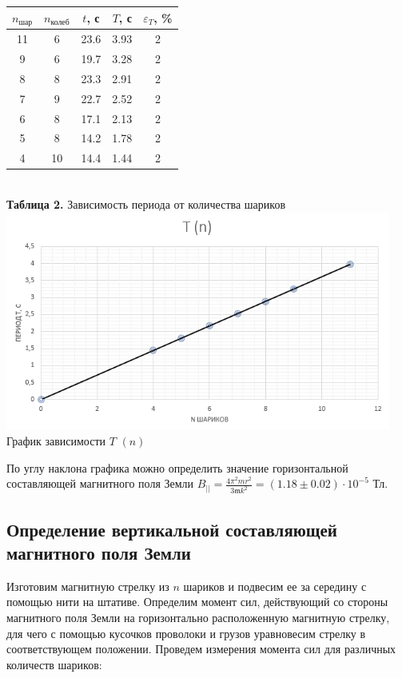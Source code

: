 \documentclass[a4paper,12pt]{article} %
\begin{document}
\begin{center}
    \begin{tabular}{|c|c|c|c|c|}\hline
    $n_{\text{шар}}$ & $n_{\text{колеб}}$ & $t$, с & $T$, с & $\varepsilon_T$, \%\\ \hline
        11 & 6 &  23.6 & 3.93 & 2 \\ \hline
        9  & 6 &  19.7 & 3.28 & 2 \\ \hline
        8  & 8 &  23.3 & 2.91 & 2 \\ \hline
        7  & 9 &  22.7 & 2.52 & 2 \\ \hline
        6  & 8 &  17.1 & 2.13 & 2 \\ \hline
        5  & 8 &  14.2 & 1.78 & 2 \\ \hline
        4  & 10 & 14.4 & 1.44 & 2 \\ \hline
\end{tabular}\\
\hfill \break \textbf {Таблица 2.} Зависимость периода от количества шариков\\
\includegraphics[width=0.95\textwidth]{3.1.3_6.png}\\
График зависимости $T$ $(n)$~\\
\end{center}

\hfill \break По углу наклона графика можно определить значение горизонтальной составляющей магнитного поля Земли $B_{||} = \frac{4\pi^{2}mr^2}{3\mathfrak{m}k^2} = (1.18 \pm 0.02) \cdot 10^{-5}$ Тл.

\subsection{Определение вертикальной составляющей магнитного поля Земли}

\hfill \break Изготовим магнитную стрелку из $n$ шариков и подвесим ее за середину с помощью нити на штативе. Определим момент сил, действующий со стороны магнитного поля Земли на горизонтально расположенную магнитную стрелку, для чего с помощью кусочков проволоки и грузов уравновесим стрелку в соответствующем положении. Проведем измерения момента сил для различных количеств шариков:
\end{document}
